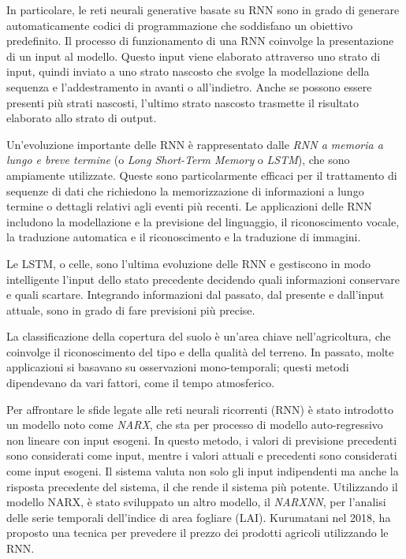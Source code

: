 In particolare, le reti neurali generative basate su RNN sono in grado di generare automaticamente codici di programmazione che soddisfano un obiettivo predefinito. Il processo di funzionamento di una RNN coinvolge la presentazione di un input al modello. Questo input viene elaborato attraverso uno strato di input, quindi inviato a uno strato nascosto che svolge la modellazione della sequenza e l'addestramento in avanti o all'indietro. Anche se possono essere presenti più strati nascosti, l'ultimo strato nascosto trasmette il risultato elaborato allo strato di output.

Un'evoluzione importante delle RNN è rappresentato dalle \textit{RNN a memoria a lungo e breve termine} (o \textit{Long Short-Term Memory} o \textit{LSTM}), che sono ampiamente utilizzate. Queste sono particolarmente efficaci per il trattamento di sequenze di dati che richiedono la memorizzazione di informazioni a lungo termine o dettagli relativi agli eventi più recenti. Le applicazioni delle RNN includono la modellazione e la previsione del linguaggio, il riconoscimento vocale, la traduzione automatica e il riconoscimento e la traduzione di immagini.

Le LSTM, o celle, sono l'ultima evoluzione delle RNN e gestiscono in modo intelligente l'input dello stato precedente decidendo quali informazioni conservare e quali scartare. Integrando informazioni dal passato, dal presente e dall'input attuale, sono in grado di fare previsioni più precise. 

La classificazione della copertura del suolo è un'area chiave nell'agricoltura, che coinvolge il riconoscimento del tipo e della qualità del terreno. In passato, molte applicazioni si basavano su osservazioni mono-temporali; questi metodi dipendevano da vari fattori, come il tempo atmosferico.

Per affrontare le sfide legate alle reti neurali ricorrenti (RNN) è stato introdotto un modello noto come \textit{NARX}, che sta per processo di modello auto-regressivo non lineare con input esogeni. In questo metodo, i valori di previsione precedenti sono considerati come input, mentre i valori attuali e precedenti sono considerati come input esogeni. Il sistema valuta non solo gli input indipendenti ma anche la risposta precedente del sistema, il che rende il sistema più potente. Utilizzando il modello NARX, è stato sviluppato un altro modello, il \textit{NARXNN}, per l'analisi delle serie temporali dell'indice di area fogliare (LAI). Kurumatani nel 2018, ha proposto una tecnica per prevedere il prezzo dei prodotti agricoli utilizzando le RNN.

